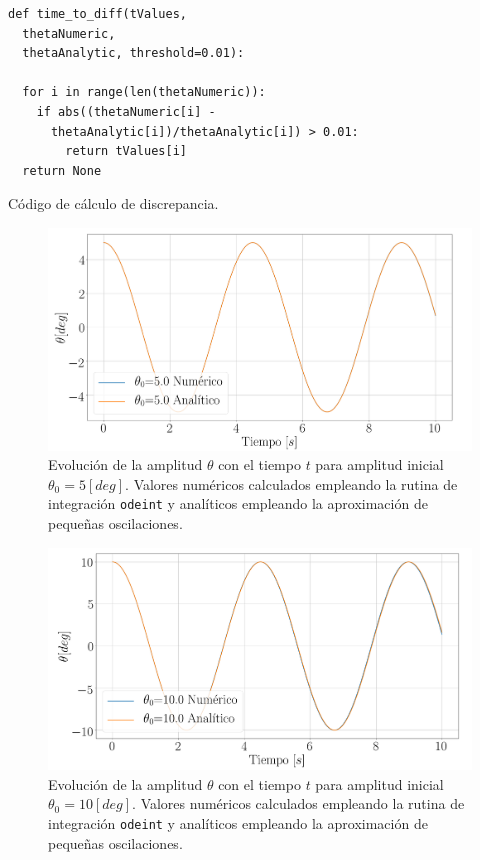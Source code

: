 \documentclass[journal]{IEEEtran}
\newenvironment{code}{\captionsetup{type=listing}}{\par\addvspace{\baselineskip}}
\begin{document}
\begin{code}
  \begin{verbatim}
def time_to_diff(tValues,
  thetaNumeric,
  thetaAnalytic, threshold=0.01):

  for i in range(len(thetaNumeric)):
    if abs((thetaNumeric[i] - 
      thetaAnalytic[i])/thetaAnalytic[i]) > 0.01:
        return tValues[i]
  return None
  \end{verbatim}
  \caption{Código de cálculo de discrepancia.}
  \label{code:discrepancy}
\end{code}


\begin{figure}[!htb]
  \centering
  \includegraphics[width=\linewidth]{theta_5_diff}
  \caption{Evolución de la amplitud $\theta$ con el tiempo $t$ para amplitud inicial $\theta_0 = 5 [deg]$. Valores numéricos calculados empleando la rutina de integración \texttt{odeint} y analíticos empleando la aproximación de pequeñas oscilaciones.}
  \label{fig:numanal_5}
\end{figure}
\begin{figure}[!htb]
  \centering
  \includegraphics[width=\linewidth]{theta_10_diff}
  \caption{Evolución de la amplitud $\theta$ con el tiempo $t$ para amplitud inicial $\theta_0 = 10 [deg]$. Valores numéricos calculados empleando la rutina de integración \texttt{odeint} y analíticos empleando la aproximación de pequeñas oscilaciones.}
  \label{fig:numanal_10}
\end{figure}
\end{document}
